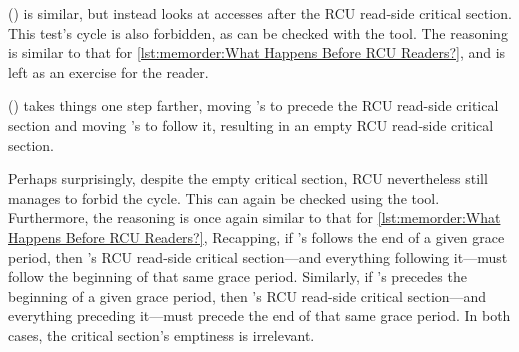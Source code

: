 ()
is similar, but instead looks at accesses after the RCU read-side
critical section.
This test's cycle is also forbidden, as can be checked with the 
tool.
The reasoning is similar to that for
\cref{lst:memorder:What Happens Before RCU Readers?},
and is left as an exercise for the reader.

\begin{listing}[tb]

\caption{What Happens With Empty RCU Readers?}
\label{lst:memorder:What Happens With Empty RCU Readers?}
\end{listing}

()
takes things one step farther, moving 's 
to precede the RCU read-side critical section and moving
's  to follow it, resulting in an
empty RCU read-side critical section.

Perhaps surprisingly, despite the empty critical section, RCU nevertheless
still manages to forbid the cycle.
This can again be checked using the  tool.
Furthermore, the reasoning is once again similar to that for
\cref{lst:memorder:What Happens Before RCU Readers?},
Recapping, if 's  follows the end of a given
grace period, then 's RCU read-side critical section---and
everything following it---must follow the beginning of that same grace
period.
Similarly, if 's  precedes the beginning of a
given grace period, then 's RCU read-side critical section---and
everything preceding it---must precede the end of that same grace period.
In both cases, the critical section's emptiness is irrelevant.

\QuickQuizEnd


